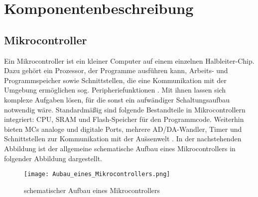\section{Komponentenbeschreibung}
\subsection{Mikrocontroller}
Ein Mikrocontroller ist ein kleiner Computer auf einem einzelnen Halbleiter-Chip. Dazu geh\"ort ein Prozessor, der Programme ausf\"uhren kann, Arbeits- und Programmspeicher sowie Schnittstellen, die eine Kommunikation mit der Umgebung erm\"oglichen sog. Peripheriefunktionen \cite{Wikibooks:2014:Online}. Mit ihnen lassen sich komplexe Aufgaben l\"osen, f\"ur die sonst ein aufw\"andiger Schaltungsaufbau notwendig w\"are. Standardm\"a{\ss}ig sind folgende Bestandteile in Mikrocontrollern integriert:
CPU, SRAM und Flash-Speicher f\"ur den Programmcode. Weiterhin bieten MCs analoge und digitale Ports, mehrere AD/DA-Wandler, Timer und Schnittstellen zur Kommunikation mit der Au\"{ss}enwelt \cite{Viktor:Seib:2014:Online}. In der nachstehenden Abbildung ist der allgemeine schematische Aufbau eines Mikrocontrollers in folgender Abbildung dargestellt.
\begin{figure}[h!]
	\centering
		\texttt{[image: Aubau\_eines\_Mikrocontrollers.png]}
	\caption{schematischer Aufbau eines Mikrocontrollers \cite{habil:Ostermeye:2014:Online}}
	\label{Aufbau eines Mikrocontrollers}
\end{figure}

